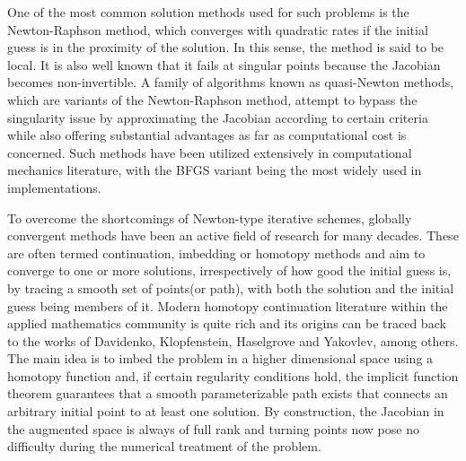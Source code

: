 One of the
most common solution methods used for such problems is the Newton-Raphson 
method\cite{Ypma:1995}, which
converges with quadratic rates if the initial guess is in the proximity of the
solution. In this sense, the method is said to be local. It is also well known 
that it fails at singular points because the Jacobian becomes 
non-invertible\cite{Dennis:1996}. A family of 
algorithms known as quasi-Newton
methods\cite{Broyden:1965,Davidon:1991,Berndt:1974}, which are variants of the 
Newton-Raphson method, attempt to bypass the singularity issue by approximating 
the Jacobian according to certain criteria while also offering substantial
advantages as far as computational cost is concerned. Such methods have been 
utilized extensively in
computational mechanics literature\cite{Matthies:1979,Hughes:1983}, with the 
BFGS\cite{Liu:1989} variant being the most widely used in implementations.

To overcome the shortcomings of Newton-type iterative schemes, 
globally convergent methods have been an active field of research for many
decades\cite{Allgower:2003}. These are often termed continuation, imbedding or 
homotopy methods\cite{Rheinboldt:2000} and aim to converge to one or more 
solutions, irrespectively of how good the initial guess is, by tracing a smooth
set of points(or path), with both the solution and the initial guess being
members of it. Modern homotopy continuation literature within the applied
mathematics community is quite
rich\cite{Keller:1978,Li:1980,Chow:1978,Chow:1979,Watson:1989,Watson:1990,Allgower:1981,Rheinboldt:1980,Rheinboldt:1983,Wayburn:1987}
and its origins can be traced back to the works of
Davidenko\cite{Davidenko:1953a,Davidenko:1953},
Klopfenstein\cite{Klopfenstein:1961},
Haselgrove\cite{Haselgrove:1961} and Yakovlev\cite{Yakovlev:1964}, among others.
The main idea is to imbed the problem in a higher dimensional space using a
homotopy function and, if 
certain regularity conditions hold, the implicit function theorem guarantees that a
smooth parameterizable path exists that connects an arbitrary initial point 
to at least 
one solution. By construction, the Jacobian in the augmented space is always of
full rank and turning points now pose no difficulty during the numerical
treatment of the problem.

